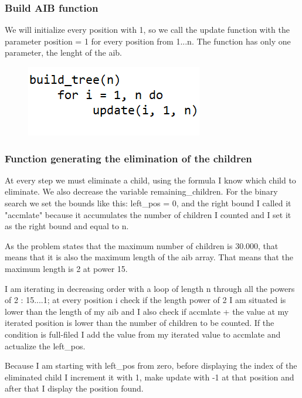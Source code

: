 \documentclass{article}
\begin{document}
\subsubsection{Build AIB function}
We will initialize every position with 1, so we call the update function with the parameter position = 1 for every position from 1...n. 
The function has only one parameter, the lenght of the aib.

\begin{figure}[h!]
\includegraphics[scale=0.7]{build_aib.png}
\end{figure}

\subsubsection{Function generating the elimination of the children}

\indent At every step we must eliminate a child, using the formula I know which child to eliminate. We also decrease the variable remaining\_children. 
\indent For the binary search we set the bounds like this: left\_pos = 0, and the right bound I called it "accmlate" because it accumulates the number of children I counted and I set it as the right bound and equal to n. 

\indent As the problem states that the maximum number of children is 30.000, that means that it is also the maximum length of the aib array. That means that the maximum length is 2 at power 15. 

\indent I am iterating in decreasing order with a loop of length n through all the powers of 2 : 15....1;  at every position i check if the length power of 2 I am situated is lower than the length of my aib and I also check if  accmlate + the value at my iterated position is lower than the number of children to be counted. If the condition is full-filed I add the value from my iterated value to accmlate and actualize the left\_pos.

\indent Because I am starting with left\_pos from zero, before displaying the index of the eliminated child I increment it with 1, make update with -1 at that position and after that I display the position found.
\end{document}
